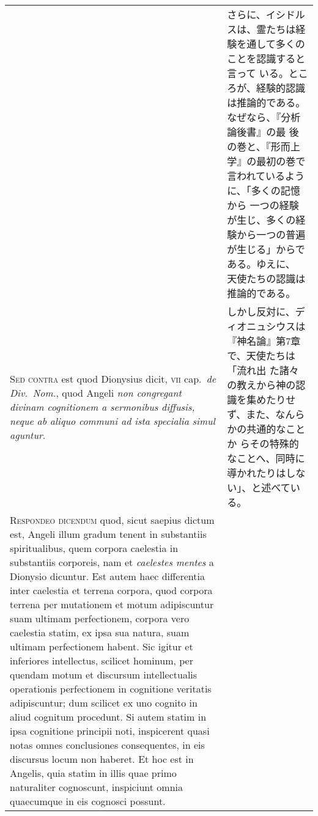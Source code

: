 \documentclass[10pt]{jsarticle} %
\begin{document}
\begin{longtable}{p{21em}p{21em}}
&

さらに、イシドルスは、霊たちは経験を通して多くのことを認識すると言って
いる。ところが、経験的認識は推論的である。なぜなら、『分析論後書』の最
後の巻と、『形而上学』の最初の巻で言われているように、「多くの記憶から
一つの経験が生じ、多くの経験から一つの普遍が生じる」からである。ゆえに、
天使たちの認識は推論的である。


\\



{\scshape Sed contra} est quod Dionysius dicit, {\scshape vii}
cap.~{\itshape de Div.~Nom.}, quod Angeli {\itshape non congregant divinam cognitionem a
sermonibus diffusis, neque ab aliquo communi ad ista specialia simul
aguntur}.


&

しかし反対に、ディオニュシウスは『神名論』第7章で、天使たちは「流れ出
た諸々の教えから神の認識を集めたりせず、また、なんらかの共通的なことか
らその特殊的なことへ、同時に導かれたりはしない」、と述べている。


\\



{\scshape Respondeo dicendum} quod, sicut saepius dictum est, Angeli
illum gradum tenent in substantiis spiritualibus, quem corpora
caelestia in substantiis corporeis, nam et {\itshape caelestes mentes}
a Dionysio dicuntur. Est autem haec differentia inter caelestia et
terrena corpora, quod corpora terrena per mutationem et motum
adipiscuntur suam ultimam perfectionem, corpora vero caelestia statim,
ex ipsa sua natura, suam ultimam perfectionem habent. Sic igitur et
inferiores intellectus, scilicet hominum, per quendam motum et
discursum intellectualis operationis perfectionem in cognitione
veritatis adipiscuntur; dum scilicet ex uno cognito in aliud cognitum
procedunt. Si autem statim in ipsa cognitione principii noti,
inspicerent quasi notas omnes conclusiones consequentes, in eis
discursus locum non haberet. Et hoc est in Angelis, quia statim in
illis quae primo naturaliter cognoscunt, inspiciunt omnia quaecumque
in eis cognosci possunt.




&


\end{longtable}
\end{document}
